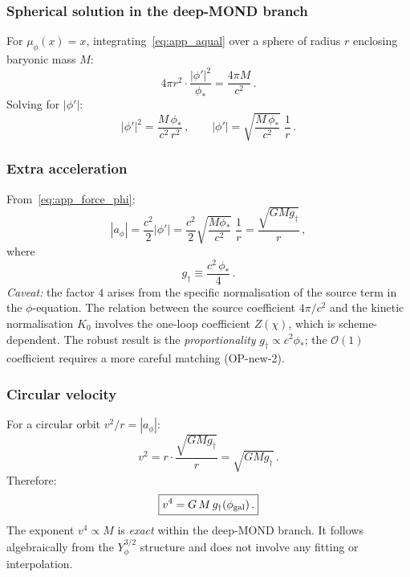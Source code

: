 \documentclass[11pt,a4paper]{article}
\numberwithin{equation}{section}
\begin{document}
\subsubsection{Spherical solution in the deep-MOND branch}

For $\mu_\phi(x) = x$, integrating~\eqref{eq:app_aqual} over
a sphere of radius $r$ enclosing baryonic mass $M$:
\begin{equation}
4\pi r^2 \cdot \frac{|\phi'|^2}{\phi_*}
= \frac{4\pi M}{c^2}\,.
\end{equation}
Solving for $|\phi'|$:
\begin{equation}
|\phi'|^2 = \frac{M\,\phi_*}{c^2\,r^2}\,,
\qquad
|\phi'| = \sqrt{\frac{M\,\phi_*}{c^2}}\;\frac{1}{r}\,.
\label{eq:app_phiprime}
\end{equation}

\subsubsection{Extra acceleration}

From~\eqref{eq:app_force_phi}:
\begin{equation}
|a_\phi| = \frac{c^2}{2}|\phi'|
= \frac{c^2}{2}\sqrt{\frac{M\phi_*}{c^2}}\;\frac{1}{r}
= \frac{\sqrt{GM g_\dagger}}{r}\,,
\end{equation}
where
\begin{equation}
g_\dagger \equiv \frac{c^2\,\phi_*}{4}\,.
\label{eq:app_gdagger}
\end{equation}
\emph{Caveat:} the factor $4$ arises from the specific
normalisation of the source term in the $\phi$-equation.
The relation between the source coefficient $4\pi/c^2$ and
the kinetic normalisation $K_0$ involves the one-loop
coefficient $Z(\chi)$, which is scheme-dependent.
The robust result is the \emph{proportionality}
$g_\dagger \propto c^2\phi_*$; the $\mathcal{O}(1)$ coefficient
requires a more careful matching (OP-new-2).

\subsubsection{Circular velocity}

For a circular orbit $v^2/r = |a_\phi|$:
\begin{equation}
v^2 = r\cdot\frac{\sqrt{GMg_\dagger}}{r}
= \sqrt{GMg_\dagger}\,.
\end{equation}
Therefore:
\begin{equation}
\boxed{v^4 = G\,M\,g_\dagger(\phi_{\rm gal})\,.}
\end{equation}
The exponent $v^4 \propto M$ is \emph{exact} within the
deep-MOND branch. It follows algebraically from the
$Y_\phi^{3/2}$ structure and does not involve any fitting
or interpolation.
\end{document}
